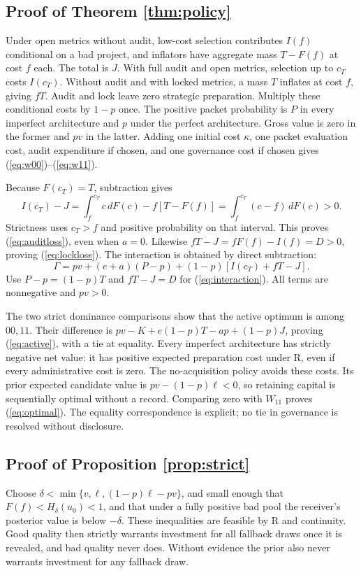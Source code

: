 \documentclass[11pt]{article}
\begin{document}
\subsection{Proof of Theorem \ref{thm:policy}}\label{app:policy}
Under open metrics without audit, low-cost selection contributes $I(f)$ conditional on a bad project, and inflators have aggregate mass $T-F(f)$ at cost $f$ each. The total is $J$. With full audit and open metrics, selection up to $c_T$ costs $I(c_T)$. Without audit and with locked metrics, a mass $T$ inflates at cost $f$, giving $fT$. Audit and lock leave zero strategic preparation. Multiply these conditional costs by $1-p$ once. The positive packet probability is $P$ in every imperfect architecture and $p$ under the perfect architecture. Gross value is zero in the former and $pv$ in the latter. Adding one initial cost $\kappa$, one packet evaluation cost, audit expenditure if chosen, and one governance cost if chosen gives (\ref{eq:w00})--(\ref{eq:w11}).

Because $F(c_T)=T$, subtraction gives
\[
I(c_T)-J=\int_f^{c_T}c\,dF(c)-f[T-F(f)]
=\int_f^{c_T}(c-f)\,dF(c)>0.
\]
Strictness uses $c_T>f$ and positive probability on that interval. This proves (\ref{eq:auditloss}), even when $a=0$. Likewise $fT-J=fF(f)-I(f)=D>0$, proving (\ref{eq:lockloss}). The interaction is obtained by direct subtraction:
\[
\Gamma=pv+(e+a)(P-p)+(1-p)[I(c_T)+fT-J].
\]
Use $P-p=(1-p)T$ and $fT-J=D$ for (\ref{eq:interaction}). All terms are nonnegative and $pv>0$.

The two strict dominance comparisons show that the active optimum is among $00,11$. Their difference is $pv-K+e(1-p)T-ap+(1-p)J$, proving (\ref{eq:active}), with a tie at equality. Every imperfect architecture has strictly negative net value: it has positive expected preparation cost under R, even if every administrative cost is zero. The no-acquisition policy avoids these costs. Its prior expected candidate value is $pv-(1-p)\ell<0$, so retaining capital is sequentially optimal without a record. Comparing zero with $W_{11}$ proves (\ref{eq:optimal}). The equality correspondence is explicit; no tie in governance is resolved without disclosure.
\subsection{Proof of Proposition \ref{prop:strict}}\label{app:strict}
Choose $\delta<\min\{v,\ell,(1-p)\ell-pv\}$, and small enough that $F(f)<H_\delta(u_0)<1$, and that under a fully positive bad pool the receiver's posterior value is below $-\delta$. These inequalities are feasible by R and continuity. Good quality then strictly warrants investment for all fallback draws once it is revealed, and bad quality never does. Without evidence the prior also never warrants investment for any fallback draw.
\end{document}
